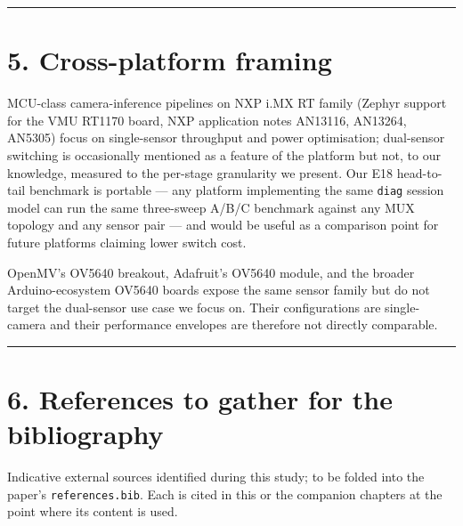 \begin{center}\rule{0.5\linewidth}{0.5pt}\end{center}

\section{5. Cross-platform framing}\label{cross-platform-framing}

MCU-class camera-inference pipelines on NXP i.MX RT family (Zephyr
support for the VMU RT1170 board, NXP application notes AN13116,
AN13264, AN5305) focus on single-sensor throughput and power
optimisation; dual-sensor switching is occasionally mentioned as a
feature of the platform but not, to our knowledge, measured to the
per-stage granularity we present. Our E18 head-to-tail benchmark is
portable --- any platform implementing the same \texttt{diag} session
model can run the same three-sweep A/B/C benchmark against any MUX
topology and any sensor pair --- and would be useful as a comparison
point for future platforms claiming lower switch cost.

OpenMV's OV5640 breakout, Adafruit's OV5640 module, and the broader
Arduino-ecosystem OV5640 boards expose the same sensor family but do not
target the dual-sensor use case we focus on. Their configurations are
single-camera and their performance envelopes are therefore not directly
comparable.

\begin{center}\rule{0.5\linewidth}{0.5pt}\end{center}

\section{6. References to gather for the
bibliography}\label{references-to-gather-for-the-bibliography}

Indicative external sources identified during this study; to be folded
into the paper's \texttt{references.bib}. Each is cited in this or the
companion chapters at the point where its content is used.

